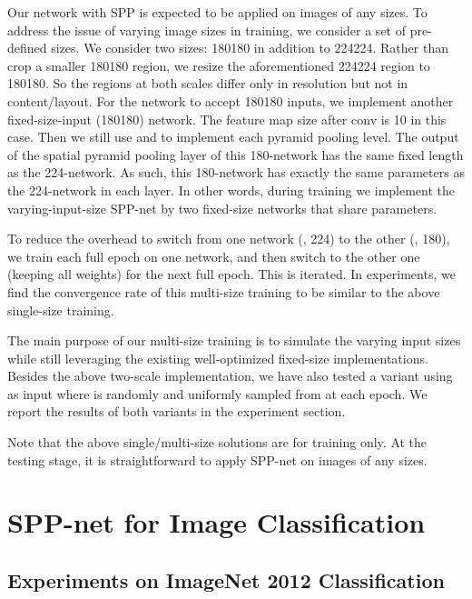 \documentclass[10pt,journal,cspaper,compsoc]{IEEEtran}
\begin{document}
Our network with SPP is expected to be applied on images of any sizes. To address the issue of varying image sizes in training, we consider a set of pre-defined sizes.
We consider two sizes: 180180 in addition to 224224. Rather than crop a smaller 180180 region, we resize the aforementioned 224224 region to 180180. So the regions at both scales differ only in resolution but not in content/layout. For the network to accept 180180 inputs, we implement another fixed-size-input (180180) network. The feature map size after conv is 10 in this case. Then we still use  and  to implement each pyramid pooling level.
The output of the spatial pyramid pooling layer of this 180-network has the same fixed length as the 224-network. As such, this 180-network has exactly the same parameters as the 224-network in each layer. In other words, during training we implement the varying-input-size SPP-net by two fixed-size networks that share parameters.

To reduce the overhead to switch from one network (\eg, 224) to the other (\eg, 180), we train each full epoch on one network, and then switch to the other one (keeping all weights) for the next full epoch. This is iterated.
In experiments, we find the convergence rate of this multi-size training to be similar to the above single-size training.

The main purpose of our multi-size training is to simulate the varying input sizes while still leveraging the existing well-optimized fixed-size implementations. Besides the above two-scale implementation, we have also tested a variant using  as input where  is randomly and uniformly sampled from  at each epoch. We report the results of both variants in the experiment section.

Note that the above single/multi-size solutions are for training only. At the testing stage, it is straightforward to apply SPP-net on images of any sizes.

\section{SPP-net for Image Classification}
\label{sec:classification}

\subsection{Experiments on ImageNet 2012 Classification}
\end{document}
